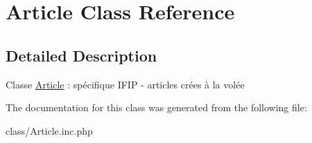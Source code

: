 \hypertarget{class_article}{
\section{Article Class Reference}
\label{class_article}
}


\subsection{Detailed Description}
Classe \hyperlink{class_article}{Article} : spécifique IFIP -\/ articles crées à la volée 

The documentation for this class was generated from the following file:\begin{DoxyCompactItemize}
\item 
class/Article.inc.php\end{DoxyCompactItemize}
